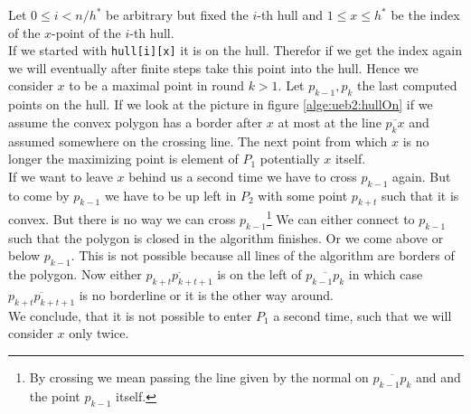 \documentclass[11pt,a4paper,ngerman]{article}
\begin{document}
\begin{description}
\begin{enumerate}[a)]
        Let $0 \leq i < n / h^*$ be arbitrary but fixed the $i$-th hull and
        $1 \leq x \leq h^*$ be the index of the $x$-point of the $i$-th hull.\\

        If we started with \lstinline|hull[i][x]| it is on the hull. Therefor
        if we get the index again we will eventually after finite steps
        take this point into the hull. Hence we consider $x$ to be a maximal
        point in round $k > 1$. Let $p_{k-1}, p_k$ the last computed points
        on the hull.
        If we look at the picture in figure \ref{alge:ueb2:hullOn}
        if we assume the convex polygon has a border after $x$ at most 
        at the line $\overline{p_kx}$ and assumed somewhere on the crossing line.
        The next point from which $x$ is no longer the maximizing point is
        element of $P_1$ potentially $x$ itself.\\
        If we want to leave $x$ behind us a second time we have to cross $p_{k-1}$
        again. But to come by $p_{k-1}$ we have to be up left in $P_2$ with some
        point $p_{k+t}$ such that it is convex. But there is no way we can
        cross $p_{k-1}$\footnote{By crossing we mean passing the line given
        by the normal on $\overline{p_{k-1}p_k}$ and and the point $p_{k-1}$ itself.}
        We can either connect to $p_{k-1}$ such that the polygon is closed in the
        algorithm finishes. Or we come above or below $p_{k-1}$.
        This is not possible because all lines of the algorithm are borders
        of the polygon. Now either $\overline{p_{k+t}p_{k+t+1}}$ is on the left
        of $\overline{p_{k-1}p_k}$ in which case $\overline{p_{k+t}p_{k+t+1}}$ is
        no borderline or it is the other way around.\\

        We conclude, that it is not possible to enter $P_1$ a second time,
        such that we will consider $x$ only twice.\\


\end{enumerate}
\end{description}
\end{document}
